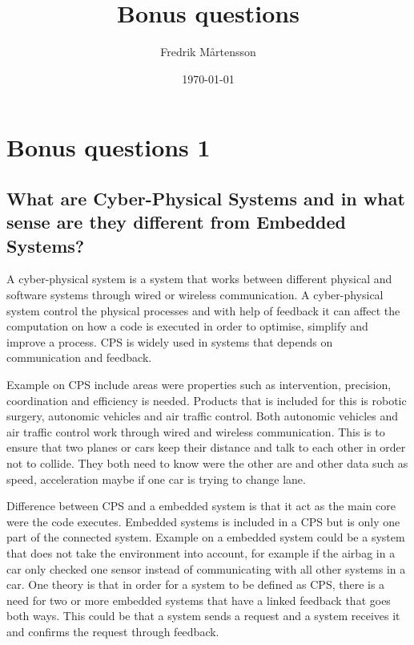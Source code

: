 \documentclass[../../../main.tex]{subfiles}
\title{Bonus questions}
\author{Fredrik Mårtensson}
\date{\today}
\begin{document}
\maketitle
\section{Bonus questions 1}
\subsection{What are Cyber-Physical Systems and in what sense are they different from Embedded Systems?}
A cyber-physical system is a system that works between different physical and software systems through wired or wireless communication.  A cyber-physical system control the physical processes and with help of feedback it can affect the computation on how a code is executed in order to optimise, simplify and improve a process. CPS is widely used in systems that depends on communication and feedback.

Example on CPS include areas were properties such as intervention, precision, coordination and efficiency is needed. Products that is included for this is robotic surgery, autonomic vehicles and air traffic control. Both autonomic vehicles and air traffic control work through wired and wireless communication. This is to ensure that two planes or cars keep their distance and talk to each other in order not to collide. They both need to know were the other are and other data such as speed, acceleration maybe if one car is trying to change lane.

Difference between CPS and a embedded system is that it act as the main core were the code executes. Embedded systems is included in a CPS but is only one part of the connected system. Example on a embedded system could be a system that does not take the environment into account, for example if the airbag in a car only checked one sensor instead of communicating with all other systems in a car. One theory is that in order for a system to be defined as CPS, there is a need for two or more embedded systems that have a linked feedback that goes both ways. This could be that a system sends a request and a system receives it and confirms the request through feedback.
\end{document}
